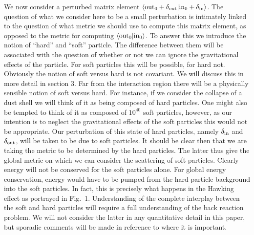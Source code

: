 We now consider a perturbed matrix element $\langle {\rm
out}_0+\delta_{{\rm out}}|{\rm in}_0+\delta_{{\rm in}}\rangle$. The question of
what we consider here to be a small perturbation is intimately linked
to the question of what metric we should use to compute this matrix
element, as opposed to the metric for computing $\langle {\rm
out}_0|{\rm in}_0\rangle$. To answer this we introduce the notion of
``hard'' and ``soft'' particle. The difference between them will be
associated with the question of whether or not we can ignore the
gravitational effects of the particle. For soft particles this will be
possible, for hard not. Obviously the notion of soft versus hard is not
covariant. We will discuss this in more detail in section 3. Far from
the interaction region there will be a physically sensible notion of
soft versus hard. For instance, if we consider the collapse of a dust
shell we will think of it as being composed of hard particles. One
might also be tempted to think of it as composed of $10^{40}$ soft
particles, however, as our intention is to neglect the gravitational
effects of the soft particles this would not be appropriate. Our
perturbation of this state of hard particles, namely $\delta_{{\rm in}}$
and $\delta_{{\rm out}}$, will be taken to be due to soft particles. It
should be clear then that we are taking the metric to be determined by
the hard particles. The latter thus give the global metric on which we
can consider the scattering of soft particles. Clearly energy will not
be conserved for the soft particles alone. For global energy
conservation, energy would have to be pumped from the hard particle
background into the soft particles. In fact, this is precisely what
happens in the Hawking effect as portrayed in Fig.~1. Understanding of
the complete interplay between the soft and hard particles will require
a full understanding of the back reaction problem. We will not consider
the latter in any quantitative detail in this paper, but sporadic
comments will be made in reference to where it is important.


